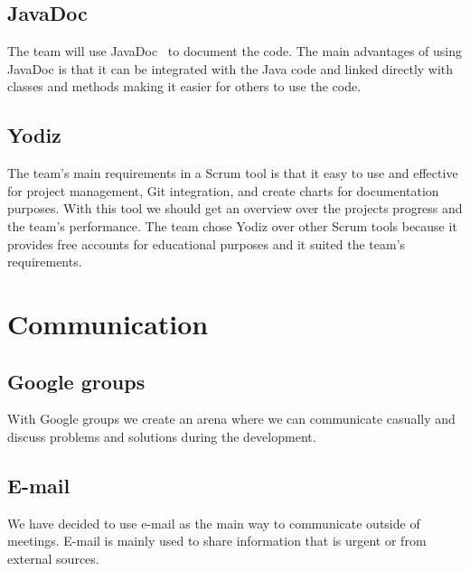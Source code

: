 \subsection{JavaDoc}
The team will use JavaDoc~\cite{javadoc} to document the code. The main advantages of using JavaDoc is that it can be 
integrated with the Java code and linked directly with classes and methods making it easier for others to
use the code.

\subsection{Yodiz}
The team's main requirements in a Scrum tool is that it easy to use and effective for project management, 
Git integration, and create charts for documentation purposes. With this tool we should get an overview over 
the projects progress and the team's performance. The team chose Yodiz over other Scrum tools because it provides 
free accounts for educational purposes and it suited the team's requirements. 

\section{Communication}
\subsection{Google groups}
With Google groups we create an arena where we can communicate casually and discuss problems and solutions during 
the development.

\subsection{E-mail}
We have decided to use e-mail as the main way to communicate outside of meetings. E-mail is mainly used to 
share information that is urgent or from external sources.

